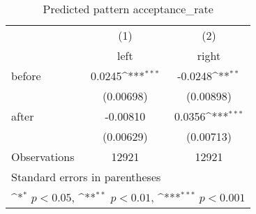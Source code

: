 \begin{table}[htbp]\centering
\def\sym#1{\ifmmode^{#1}\else\(^{#1}\)\fi}
\caption{Predicted pattern acceptance\_rate}
\begin{tabular}{l*{2}{c}}
\hline\hline
                    &\multicolumn{1}{c}{(1)}&\multicolumn{1}{c}{(2)}\\
                    &\multicolumn{1}{c}{left}&\multicolumn{1}{c}{right}\\
\hline
before              &      0.0245\sym{***}&     -0.0248\sym{**} \\
                    &   (0.00698)         &   (0.00898)         \\
[1em]
after               &    -0.00810         &      0.0356\sym{***}\\
                    &   (0.00629)         &   (0.00713)         \\
\hline
Observations        &       12921         &       12921         \\
\hline\hline
\multicolumn{3}{l}{\footnotesize Standard errors in parentheses}\\
\multicolumn{3}{l}{\footnotesize \sym{*} \(p<0.05\), \sym{**} \(p<0.01\), \sym{***} \(p<0.001\)}\\
\end{tabular}
\end{table}
